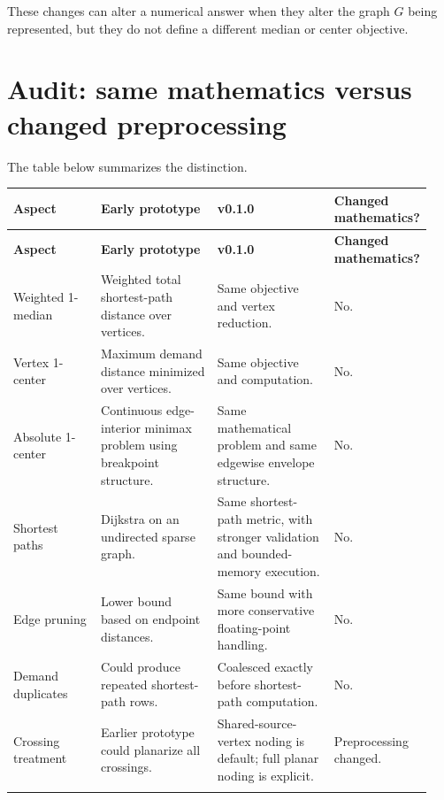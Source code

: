 \documentclass[11pt]{article}
\begin{document}
These changes can alter a numerical answer when they alter the graph \(G\) being
represented, but they do not define a different median or center objective.

\section{Audit: same mathematics versus changed preprocessing}

The table below summarizes the distinction.

\small

\begin{longtable}{p{0.21\linewidth}p{0.29\linewidth}p{0.29\linewidth}p{0.15\linewidth}}
\toprule
\textbf{Aspect}
&
\textbf{Early prototype}
&
\textbf{v0.1.0}
&
\textbf{Changed mathematics?}
\\
\midrule
\endfirsthead

\toprule
\textbf{Aspect}
&
\textbf{Early prototype}
&
\textbf{v0.1.0}
&
\textbf{Changed mathematics?}
\\
\midrule
\endhead

Weighted 1-median
&
Weighted total shortest-path distance over vertices.
&
Same objective and vertex reduction.
&
No.
\\
\addlinespace

Vertex 1-center
&
Maximum demand distance minimized over vertices.
&
Same objective and computation.
&
No.
\\
\addlinespace

Absolute 1-center
&
Continuous edge-interior minimax problem using breakpoint structure.
&
Same mathematical problem and same edgewise envelope structure.
&
No.
\\
\addlinespace

Shortest paths
&
Dijkstra on an undirected sparse graph.
&
Same shortest-path metric, with stronger validation and bounded-memory execution.
&
No.
\\
\addlinespace

Edge pruning
&
Lower bound based on endpoint distances.
&
Same bound with more conservative floating-point handling.
&
No.
\\
\addlinespace

Demand duplicates
&
Could produce repeated shortest-path rows.
&
Coalesced exactly before shortest-path computation.
&
No.
\\
\addlinespace

Crossing treatment
&
Earlier prototype could planarize all crossings.
&
Shared-source-vertex noding is default; full planar noding is explicit.
&
Preprocessing changed.
\\
\addlinespace


\end{longtable}
\end{document}
